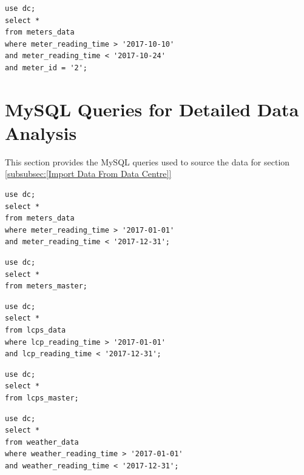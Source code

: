 \documentclass[12pt]{scrartcl}
\begin{document}
\begin{lstlisting}[frame=single,basicstyle=\footnotesize\ttfamily,
  caption={MySQL Query for Energy Consumption of the Generator during Storm Ophelia},label={list:[Energy Consumption of the Generator during Storm Ophelia]}]
use dc; 
select * 
from meters_data
where meter_reading_time > '2017-10-10'
and meter_reading_time < '2017-10-24'
and meter_id = '2';
\end{lstlisting}

\section{MySQL Queries for Detailed Data Analysis}
\label{sec:[Detailed MySQL Queries]}
This section provides the MySQL queries used to source the data for section \ref{subsubsec:[Import Data From Data Centre]}

\begin{lstlisting}[frame=single,basicstyle=\footnotesize\ttfamily,
  caption={MySQL Query for Energy Consumption in 2017},label={list:[Energy Consumption in 2017]}]
use dc; 
select * 
from meters_data
where meter_reading_time > '2017-01-01'
and meter_reading_time < '2017-12-31';
\end{lstlisting}

\begin{lstlisting}[frame=single,basicstyle=\footnotesize\ttfamily,
  caption={MySQL Query for All Meter ID Location},label={list:[All Meter ID Location]}]
use dc; 
select * 
from meters_master;
\end{lstlisting}

\begin{lstlisting}[frame=single,basicstyle=\footnotesize\ttfamily,
  caption={MySQL Query for LCP information for 2017},label={list:[LCP information for 2017]}]
use dc; 
select * 
from lcps_data
where lcp_reading_time > '2017-01-01'
and lcp_reading_time < '2017-12-31';
\end{lstlisting}

\begin{lstlisting}[frame=single,basicstyle=\footnotesize\ttfamily,
  caption={MySQL Query for LCP Location Information},label={list:[LCP Location Information]}]
use dc; 
select * 
from lcps_master;
\end{lstlisting}

\begin{lstlisting}[frame=single,basicstyle=\footnotesize\ttfamily,
  caption={MySQL Query for Weather Data for 2017},label={list:[Weather Data for 2017]}]
use dc; 
select * 
from weather_data
where weather_reading_time > '2017-01-01'
and weather_reading_time < '2017-12-31';
\end{lstlisting}
\end{document}
